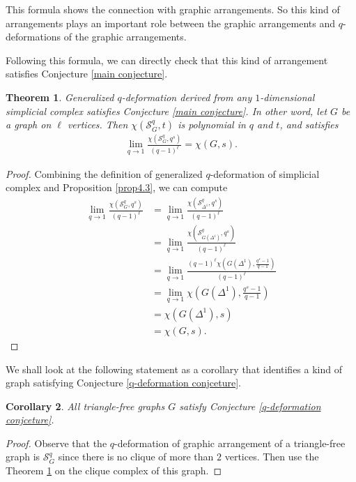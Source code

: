 \documentclass[12pt]{article}
\theoremstyle{plain}%
\newtheorem{theorem}{Theorem}[section]
\newtheorem{corollary}[theorem]{Corollary}
\theoremstyle{definition}
\begin{document}
This formula shows the connection with graphic arrangements. So this kind of arrangements plays an important role between the graphic arrangements and $q$-deformations of the graphic arrangements.

Following this formula, we can directly check that this kind of arrangement satisfies  Conjecture \ref{main conjecture}.

\begin{theorem}\label{3}
    Generalized $q$-deformation derived from any $1$-dimensional simplicial complex satisfies Conjecture \ref{main conjecture}. In other word, let $G$ be a graph on $\ell$ vertices. Then $\chi(\mathcal{S}_G^q,t)$ is polynomial in $q$ and $t$, and satisfies 
    \begin{align*}
        \lim_{q \to 1} \frac{\chi(\mathcal{S}_G^q,q^s)}{(q-1)^\ell}=\chi(G,s).
    \end{align*}
\end{theorem}
\begin{proof}
Combining the definition of generalized $q$-deformation of simplicial complex and Proposition \ref{prop4.3}, we can compute
    \begin{align*}
        \lim_{q \to 1} \frac{\chi(\mathcal{S}_G^q,q^s)}{(q-1)^\ell} &=
        \lim_{q\to 1}\frac{\chi(\mathcal{S}_{\Delta^1}^q, q^s)}{(q-1)^\ell}\\ &= \lim_{q\to 1}\frac{\chi(\mathcal{S}_{G(\Delta^1)}^q, q^s)}{(q-1)^\ell}\\
        &= \lim_{q\to 1}\frac{(q-1)^\ell\chi(G(\Delta^1), \frac{q^s-1}{q-1})}{(q-1)^\ell}\\
        &= \lim_{q\to 1}\chi(G(\Delta^1), \frac{q^s-1}{q-1})\\
        &= \chi(G(\Delta^1), s)\\
        &= \chi(G,s).
    \end{align*}
\end{proof}


We shall look at the following statement as a corollary that identifies a kind of graph satisfying Conjecture \ref{q-deformation conjceture}.


\begin{corollary}
    All triangle-free graphs $G$ satisfy Conjecture \ref{q-deformation conjceture}.
\end{corollary}

\begin{proof}
    Observe that the $q$-deformation of graphic arrangement of a triangle-free graph is $\mathcal{S}_G^q$ since there is no clique of more than $2$ vertices. Then use the Theorem \ref{3} on the clique complex of this graph.
\end{proof}
\end{document}

